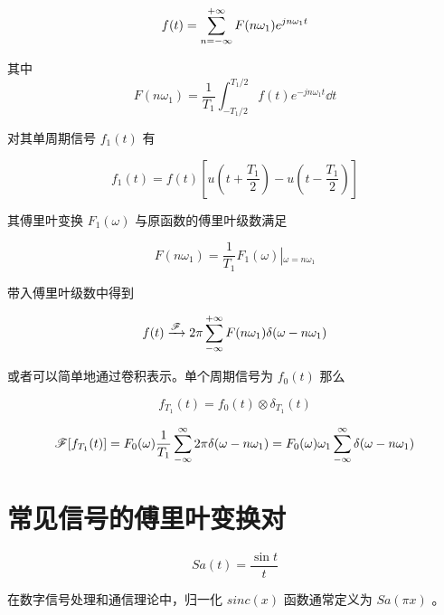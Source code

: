 \documentclass[cn,11pt,chinese,black,simple]{../elegantbook}
\begin{document}
\[f(t) = \displaystyle\sum_{n=-\infty}^{+\infty} F(n\omega_1) e^{j n \omega_1 t}\]

其中
\[F(n\omega_1) = \dfrac{1}{T_1} \int_{-T_1/2}^{T_1/2} f(t) e^{-j n \omega_1 t} \dd{t}\]

对其单周期信号 \(f_1(t)\) 有

\[f_1(t) = f(t) \left[u(t+\dfrac{T_1}{2}) - u(t-\dfrac{T_1}{2})\right]\]

其傅里叶变换 \(F_1(\omega)\) 与原函数的傅里叶级数满足

\[F(n \omega_1) = \dfrac{1}{T_1}F_1(\omega)\left|_{\omega = n \omega_1}\right.\]

带入傅里叶级数中得到

\[f(t) \xrightarrow{\mathscr{F}} 2\pi \displaystyle\sum_{-\infty}^{+\infty} F(n\omega_1) \delta(\omega - n\omega_1)\]

或者可以简单地通过卷积表示。单个周期信号为 \(f_0(t)\) 那么

\[f_{T_1}(t) = f_0(t) \otimes \delta_{T_1}(t)\]

\[\mathscr{F}[f_{T_1}(t)] = F_0(\omega) \dfrac{1}{T_1}\displaystyle\sum_{-\infty}^{\infty} 2\pi \delta(\omega - n\omega_1) = F_0(\omega) \omega_1 \displaystyle\sum_{-\infty}^{\infty} \delta(\omega - n\omega_1) \] 


\section{常见信号的傅里叶变换对}

\begin{definition}[$Sa$ 函数]
\[Sa(t) = \dfrac{\sin t}{t}\]
\end{definition}

在数字信号处理和通信理论中，归一化 \(sinc(x)\) 函数通常定义为 \(Sa(\pi x)\) 。
\end{document}
